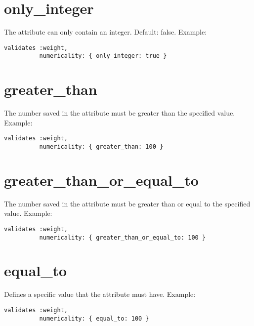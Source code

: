\documentclass[a4paper]{book}
\begin{document}
\section{only\_integer}\label{onlyux5finteger}

The attribute can only contain an integer. Default: false. Example:

\begin{shaded}\begin{verbatim}
validates :weight,
          numericality: { only_integer: true }
\end{verbatim}\end{shaded}

\section{greater\_than}\label{greaterux5fthan}

The number saved in the attribute must be greater than the specified value. Example:

\begin{shaded}\begin{verbatim}
validates :weight,
          numericality: { greater_than: 100 }
\end{verbatim}\end{shaded}

\section{greater\_than\_or\_equal\_to}\label{greaterux5fthanux5forux5fequalux5fto}

The number saved in the attribute must be greater than or equal to the specified value. Example:

\begin{shaded}\begin{verbatim}
validates :weight,
          numericality: { greater_than_or_equal_to: 100 }
\end{verbatim}\end{shaded}

\section{equal\_to}\label{equalux5fto}

Defines a specific value that the attribute must have. Example:

\begin{shaded}\begin{verbatim}
validates :weight,
          numericality: { equal_to: 100 }
\end{verbatim}\end{shaded}
\end{document}
